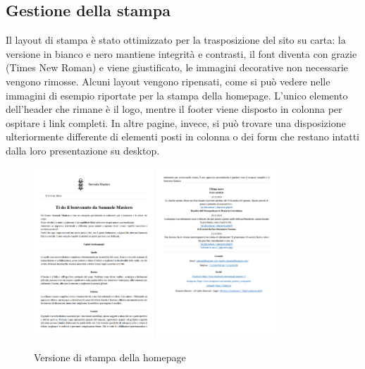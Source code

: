 \documentclass{article}
\begin{document}
\subsection{Gestione della stampa}
Il layout di stampa è stato ottimizzato per la trasposizione del sito su carta: la versione in bianco e nero mantiene integrità e contrasti, il font diventa con grazie (Times New Roman) e viene giustificato, le immagini decorative non necessarie vengono rimosse. Alcuni layout vengono ripensati, come si può vedere nelle immagini di esempio riportate per la stampa della homepage. L'unico elemento dell'header che rimane è il logo, mentre il footer viene disposto in colonna per ospitare i link completi. In altre pagine, invece, si può trovare una disposizione ulteriormente differente di elementi posti in colonna o dei form che restano intatti dalla loro presentazione su desktop.
\begin{figure} [h]
    \centering
    \includegraphics[width=0.4\textwidth]{immagini/print_1.png}
    \includegraphics[width=0.4\textwidth]{immagini/print_2.png}
    \caption{Versione di stampa della homepage}
\end{figure}
\end{document}
